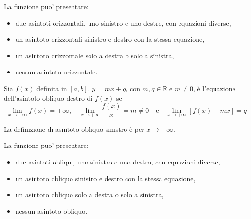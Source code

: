 \begin{property}
    La funzione puo' presentare:
    \begin{itemize}
        \item due asintoti orizzontali, uno sinistro e uno destro, con equazioni diverse,
        \item un asintoto orizzontali sinistro e destro con la stessa equazione,
        \item un asintoto orizzontale solo a destra o solo a sinistra,
        \item nessun asintoto orizzontale.
    \end{itemize}
\end{property}

\begin{definition}
    Sia $f(x)$ definita in $[a,b]$. $y=mx+q$, con $m,q\in\mathbb R$ e $m\neq 0$, è l'equazione dell'asintoto obliquo destro di $f(x)$ se
    \begin{equation*}
        \lim_{x\rightarrow+\infty}f(x)=\pm\infty,\quad \lim_{x\rightarrow+\infty}\frac{f(x)}{x}=m\neq 0\quad \text{e}\quad \lim_{x\rightarrow+\infty}[f(x)-mx]=q
    \end{equation*}
\end{definition}

La definizione di asintoto obliquo sinistro è per $x\rightarrow-\infty$.

\begin{property}
    La funzione puo' presentare:
    \begin{itemize}
        \item due asintoti obliqui, uno sinistro e uno destro, con equazioni diverse,
        \item un asintoto obliquo sinistro e destro con la stessa equazione,
        \item un asintoto obliquo solo a destra o solo a sinistra,
        \item nessun asintoto obliquo.
    \end{itemize}
\end{property}